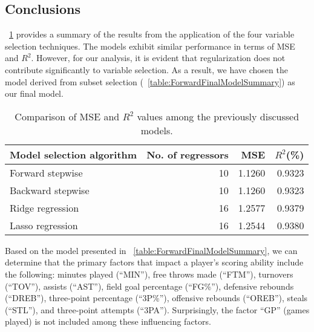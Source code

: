 \subsection{Conclusions}

\Tab~\ref{table:RegEvalParams} provides a summary of the results from the application of the four variable selection techniques.
The models exhibit similar performance in terms of MSE and $R^2$. 
However, for our analysis, it is evident that regularization does not contribute significantly to variable selection. 
As a result, we have chosen the model derived from subset selection (\Tab~\ref{table:ForwardFinalModelSummary}) as our final model.

\begin{table}[h]
	\centering
	\begin{tabular}{|| l | r | r | r ||} 
		\hline
		Model selection algorithm & No. of regressors & MSE & $R^2$(\%) \\
		\hline
		\hline
		Forward stepwise & 10 & 1.1260 & 0.9323 \\
		\hline
		Backward stepwise & 10 & 1.1260 & 0.9323 \\
		\hline
		Ridge regression & 16 & 1.2577 & 0.9379 \\
		\hline
		Lasso regression & 16 & 1.2544 & 0.9380 \\
		\hline
	\end{tabular}
	\caption{Comparison of MSE and $R^2$ values among the previously discussed models.}
	\label{table:RegEvalParams}
\end{table}

Based on the model presented in \Tab~\ref{table:ForwardFinalModelSummary}, we can determine that the primary factors that impact a player's scoring ability include the following: minutes played (``MIN''), free throws made (``FTM''), turnovers (``TOV''), assists (``AST''), field goal percentage (``FG\%''), defensive rebounds (``DREB''), three-point percentage (``3P\%''), offensive rebounds (``OREB''), steals (``STL''), and three-point attempts (``3PA'').
Surprisingly, the factor ``GP'' (games played) is not included among these influencing factors.
